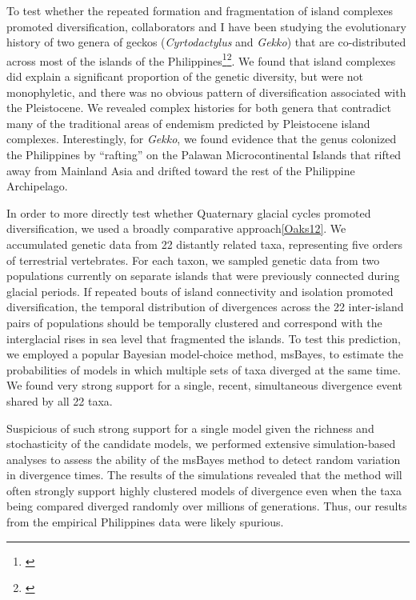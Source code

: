 To test whether the repeated formation and fragmentation of island complexes
promoted diversification, collaborators and I have been studying the
evolutionary history of two genera of geckos (\emph{Cyrtodactylus} and
\emph{Gekko}) that are co-distributed across most of the islands of the
Philippines\footnote{\label{Siler10}}\super{,}\footnote{\label{Siler12}}.
We found that island complexes did explain a significant proportion of the
genetic diversity, but were not monophyletic, and there
was no obvious pattern of diversification associated with the Pleistocene.
We revealed complex histories for both genera that contradict many of the
traditional areas of endemism predicted by Pleistocene island complexes.
Interestingly, for \emph{Gekko}, we found evidence that the genus colonized the
Philippines by ``rafting'' on the Palawan Microcontinental Islands that rifted
away from Mainland Asia and drifted toward the rest of the Philippine
Archipelago.

In order to more directly test whether Quaternary glacial cycles promoted
diversification, we used a broadly comparative approach\cref{Oaks12}.
We accumulated genetic data from 22 distantly related taxa, representing five
orders of terrestrial vertebrates.
For each taxon, we sampled genetic data from two populations currently on
separate islands that were previously connected during glacial periods.
If repeated bouts of island connectivity and isolation promoted
diversification, the temporal distribution of divergences across the 22
inter-island pairs of populations should be temporally clustered and correspond
with the interglacial rises in sea level that fragmented the islands.
To test this prediction, we employed a popular Bayesian model-choice method,
msBayes, to estimate the probabilities of models in which multiple sets of taxa
diverged at the same time.
We found very strong support
for a single, recent, simultaneous divergence event shared by all 22 taxa.

Suspicious of such strong support for a single model given the richness and
stochasticity of the candidate models,
we performed extensive simulation-based analyses to assess the ability of the
msBayes method to detect random variation in divergence times.
The results of the simulations revealed that the method will often strongly
support highly clustered models of divergence even when the taxa being compared
diverged randomly over millions of generations.
Thus, our results from the empirical Philippines data were likely spurious.

